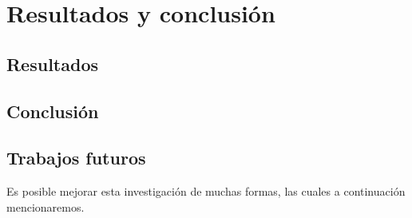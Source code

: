 \chapter{Resultados y conclusión}

\section{Resultados}

\section{Conclusión}




\section{Trabajos futuros}

Es posible mejorar esta investigación de muchas formas, las cuales a continuación mencionaremos.